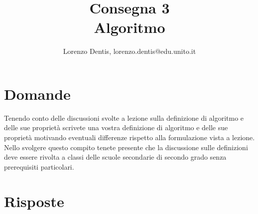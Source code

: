 \documentclass[a4paper]{article}
\begin{document}
\author{Lorenzo Dentis, lorenzo.dentis@edu.unito.it}
\title{Consegna 3 \\ \large Algoritmo}
\maketitle

\section{Domande}
Tenendo conto delle discussioni svolte a lezione sulla definizione di algoritmo e  delle sue proprietà scrivete una vostra definizione di algoritmo e delle sue proprietà motivando eventuali differenze rispetto alla formulazione vista a lezione. Nello svolgere  questo compito tenete presente che la discussione sulle definizioni deve essere rivolta a classi delle scuole secondarie di secondo grado senza prerequisiti particolari.
\section{Risposte}
\end{document}
